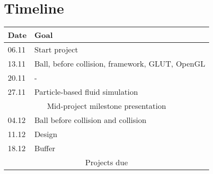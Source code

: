 \chapter*{Timeline}
\begin{center}
	\begin{tabular}{ll}
		\toprule
		Date&Goal\\
		\midrule
		06.11&Start project\\
		13.11&Ball, before collision, framework, GLUT, OpenGL\\
		20.11&-\\
		27.11&Particle-based fluid simulation\\
		\midrule
		\multicolumn{2}{c}{Mid-project milestone presentation}\\
		\midrule
		04.12&Ball before collision and collision \\
		11.12&Design\\
		18.12&Buffer\\
		\midrule
		\multicolumn{2}{c}{Projects due}\\
		\bottomrule
	\end{tabular}
\end{center}
